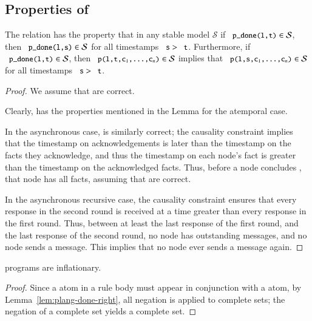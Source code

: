 \subsection{Properties of \plang}
\begin{lemma}[Sealing]
\label{lem:plang-done-right}
The relation  has the property that in any stable model $\mathcal{S}$ if $\dedalus{p_done(l,t)} \in \mathcal{S}$,  then $\dedalus{p_done(l,s)} \in \mathcal{S}$ for all timestamps $\dedalus{s} > \dedalus{t}$.  Furthermore, if $\dedalus{p_done(l,t)} \in \mathcal{S}$, then $\dedalus{p(l,t,c\sub{1},\ldots,c\sub{n})} \in \mathcal{S}$ implies that $\dedalus{p(l,s,c\sub{1},\ldots,c\sub{n})} \in \mathcal{S}$ for all timestamps $\dedalus{s} > \dedalus{t}$.
\end{lemma}
\begin{proof}
We assume that  are correct.

Clearly,  has the properties mentioned in the Lemma for the atemporal case.

In the asynchronous case,  is similarly correct; the causality constraint implies that the timestamp on acknowledgements is later than the timestamp on the facts they acknowledge, and thus the timestamp on each node's  fact is greater than the timestamp on the acknowledged facts.  Thus, before a node concludes , that node has all facts, assuming that  are correct.

In the asynchronous recursive case, the causality constraint ensures that every response in the second round is received at a time greater than every response in the first round.  Thus, between at least the last response of the first round, and the last response of the second round, no node has outstanding messages, and no node sends a message.  This implies that no node ever sends a message again.
\end{proof}

\begin{lemma}
\label{lem:plang-inflationary}
\plang programs are inflationary.
\end{lemma}
\begin{proof}
Since a  atom in a rule body must appear in conjunction with a  atom, by Lemma~\ref{lem:plang-done-right}, all negation is applied to complete sets; the negation of a complete set yields a complete set.
\end{proof}

